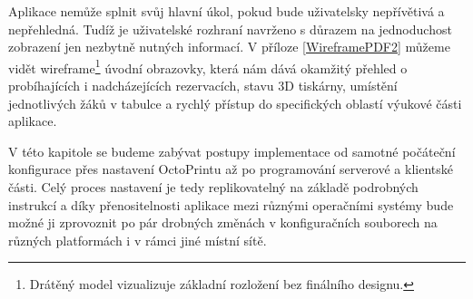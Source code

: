 \documentclass[twoside, 12pt]{article}
\begin{document}


Aplikace nemůže splnit svůj hlavní úkol, pokud bude uživatelsky nepřívětivá a nepřehledná. Tudíž je uživatelské rozhraní navrženo s důrazem na jednoduchost zobrazení jen nezbytně nutných informací. V příloze \ref{WireframePDF2} můžeme vidět wireframe\footnote{Drátěný model vizualizuje základní rozložení bez finálního designu.} úvodní obrazovky, která nám dává okamžitý přehled o probíhajících i nadcházejících rezervacích, stavu 3D tiskárny, umístění jednotlivých žáků v tabulce a rychlý přístup do specifických oblastí výukové části aplikace.



V této kapitole se budeme zabývat postupy implementace od samotné počáteční konfigurace přes nastavení OctoPrintu až po programování serverové a klientské části. Celý proces nastavení je tedy replikovatelný na základě podrobných instrukcí a díky přenositelnosti aplikace mezi různými operačními systémy bude možné ji zprovoznit po pár drobných změnách v konfiguračních souborech  na různých platformách i v rámci jiné místní sítě.




\end{document}
